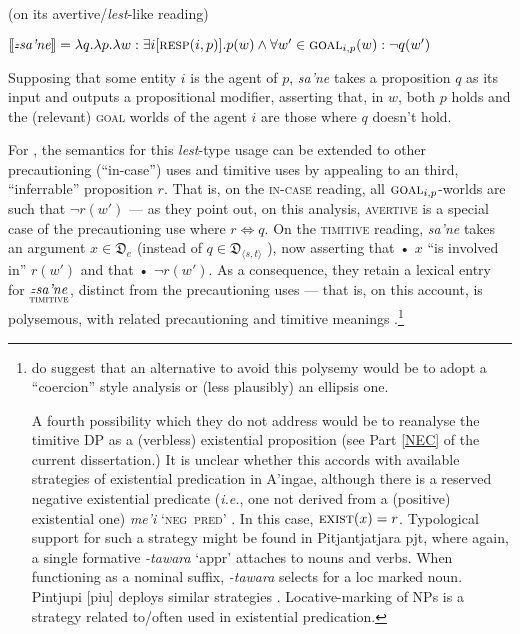\pex {} (on its avertive/\textit{lest}-like reading)


$ \llbracket \textit{\textdblhyphen sa'ne}\rrbracket=\lambda q.\lambda p.\lambda w:\exists i[\textsc{resp}(i,p)]	.p(w)\wedge \forall w'\in\textsc{goal}_{i,p}(w):\neg q(w')  $


Supposing that some entity $ i $ is the agent of $ p $, \textit{\textdblhyphen sa'ne} takes a proposition $ q $ as its input and outputs a propositional modifier, asserting that, in $ w $, both $ p $ holds and the (relevant) \textsc{goal} worlds of the agent $ i $ are those where $ q $ doesn't hold. 
\xe

\noindent For \citeauthor{AnderBois2020}, the semantics for this \textit{lest}-type usage can be extended to other precautioning (``in-case'') uses and timitive uses by appealing to an third, ``inferrable'' proposition $ r $. That is, on the \textsc{in-case} reading, all $ \textsc{goal}_{i,p}$-worlds are such that $\neg r(w') $ --- as they point out, on this analysis, \textsc{avertive} is a special case of the precautioning use where $ r\Leftrightarrow q $. On the \textsc{timitive} reading, \textit{\textdblhyphen sa'ne} takes an argument $ x\in\mathfrak D_e $ (instead of $ q\in \mathfrak D_{\langle s,t\rangle}$
), now asserting that • $ x $ ``is involved in'' $ r(w') $ and that • $ \neg r(w') $. As a consequence, they retain a lexical entry for $ \underset{\textsc{timitive}}{\textit{\textdblhyphen sa'ne}} $, distinct from the precautioning uses --- that is, on this account, \textit{} is polysemous, with related precautioning and timitive meanings \citeyearpar[15]{AnderBois2020}.\footnote{\citet[15]{AnderBois2020} do suggest that an alternative to avoid this polysemy would be to adopt a ``coercion'' style analysis or (less plausibly) an ellipsis one.
		
	A fourth possibility which they do not address would be to reanalyse the timitive DP as a (verbless) existential proposition (see Part \ref{NEC} of the current dissertation.) It is unclear whether this accords with available strategies of existential predication in A'ingae, although there is a reserved negative existential predicate (\textit{i.e.}, one not derived from a (positive) existential one) \textit{me'i} `\textsc{neg~pred}' \citep[according to][]{Hengeveld2018}. In this case, $ \textsc{exist}(x) = r$. Typological support for such a strategy might be found in Pitjantjatjara \gls{pjt}, where again, a single formative \textit{-tawara} `\gls{appr}' attaches to nouns and verbs. When functioning as a nominal suffix, \textit{-tawara} selects for a \gls{loc} marked noun. Pintjupi [\gls{piu}] deploys similar strategies \citep[16-9]{Zester2010}. Locative-marking of NPs is a strategy related to/often used in existential predication.
	}



